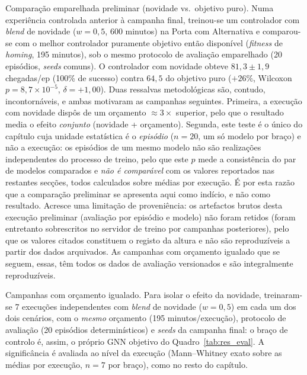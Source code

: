 \documentclass[12pt,reqno, twoside]{amsbook}
\makeatletter
\def\paragraph{\@startsection{paragraph}{4}%
  \z@\z@{-\fontdimen2\font}%
  {\normalfont\bfseries}}
\theoremstyle{plain}
\numberwithin{equation}{chapter}
\numberwithin{section}{chapter}
\numberwithin{table}{chapter}
\numberwithin{figure}{chapter}
\makeatother
\begin{document}
\paragraph{Comparação emparelhada preliminar (novidade vs.\ objetivo puro).} Numa experiência controlada anterior à campanha final, treinou-se um controlador com \textit{blend} de novidade ($w=0{,}5$, 600 minutos) na Porta com Alternativa e comparou-se com o melhor controlador puramente objetivo então disponível (\textit{fitness} de \textit{homing}, 195 minutos), sob o mesmo protocolo de avaliação emparelhado (20 episódios, \textit{seeds} comuns). O controlador com novidade obteve $81{,}3 \pm 1{,}9$ chegadas/ep (100\% de sucesso) contra $64{,}5$ do objetivo puro ($+26\%$, Wilcoxon $p = 8{,}7\times10^{-5}$, $\delta = +1{,}00$). Duas ressalvas metodológicas são, contudo, incontornáveis, e ambas motivaram as campanhas seguintes. Primeira, a execução com novidade dispôs de um orçamento $\approx 3\times$ superior, pelo que o resultado media o efeito \emph{conjunto} (novidade + orçamento). Segunda, este teste é o único do capítulo cuja unidade estatística é o \emph{episódio} ($n=20$, um só modelo por braço) e não a execução: os episódios de um mesmo modelo não são realizações independentes do processo de treino, pelo que este $p$ mede a consistência do par de modelos comparados e \emph{não é comparável} com os valores reportados nas restantes secções, todos calculados sobre médias por execução. É por esta razão que a comparação preliminar se apresenta aqui como indício, e não como resultado. Acresce uma limitação de proveniência: os artefactos brutos desta execução preliminar (avaliação por episódio e modelo) não foram retidos (foram entretanto sobrescritos no servidor de treino por campanhas posteriores), pelo que os valores citados constituem o registo da altura e não são reproduzíveis a partir dos dados arquivados. As campanhas com orçamento igualado que se seguem, essas, têm todos os dados de avaliação versionados e são integralmente reproduzíveis.

\paragraph{Campanhas com orçamento igualado.} Para isolar o efeito da novidade, treinaram-se 7 execuções independentes com \textit{blend} de novidade ($w=0{,}5$) em cada um dos dois cenários, com o \emph{mesmo} orçamento (195 minutos/execução), protocolo de avaliação (20 episódios determinísticos) e \textit{seeds} da campanha final: o braço de controlo é, assim, o próprio GNN objetivo do Quadro~\ref{tab:res_eval}. A significância é avaliada ao nível da execução (Mann--Whitney exato sobre as médias por execução, $n=7$ por braço), como no resto do capítulo.
\end{document}
